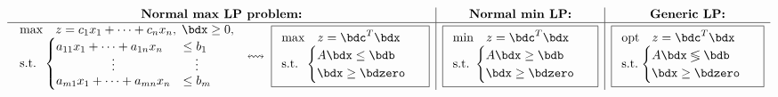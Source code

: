 \documentclass[a4paper]{article}
\begin{document}
\[
  \begin{array}[m]{c|c|c}
    \textbf{Normal max LP problem:}
    & \textbf{Normal min LP:}
    & \textbf{Generic LP:}
  \\ \hline
    \begin{array}[m]{ll}
      \max & z = c_1x_1+\cdots+c_nx_n, \;\bdx\ge0, \cr
      \mbox{s.t.} &
      \mkern-15mu
      \begin{cases}
        a_{11}x_1+\cdots+a_{1n}x_n &\le b_1 \\[-3pt]
        \hfil\vdots &  \hfil\vdots          \\[-3pt]
        a_{m1}x_1+\cdots+a_{mn}x_n &\le b_m \cr
      \end{cases}
    \end{array}
  \;\leftrightsquigarrow\;
  \boxed{
    \begin{array}[m]{ll}
      \max & z=\bdc^T\bdx\cr
      \mbox{s.t.} &
      \mkern-15mu
      \begin{cases}
      A\bdx\le\bdb\cr
      \hfill\bdx\ge\bdzero
      \end{cases}
    \end{array}
  } %
  &
  \boxed{
    \begin{array}[m]{ll}
      \min & z=\bdc^T\bdx\cr
      \mbox{s.t.} &
      \mkern-15mu
      \begin{cases}
      A\bdx\ge\bdb\cr
      \hfill\bdx\ge\bdzero
      \end{cases}
    \end{array}
  } %
  &
  \boxed{
    \begin{array}[m]{ll}
      \text{opt} & z=\bdc^T\bdx\cr
      \mbox{s.t.} &
      \mkern-15mu
      \begin{cases}
      A\bdx\lessgtr\bdb\cr
      \hfill\bdx\ge\bdzero
      \end{cases}
    \end{array}
  } %
  \end{array}
\]
\end{document}
